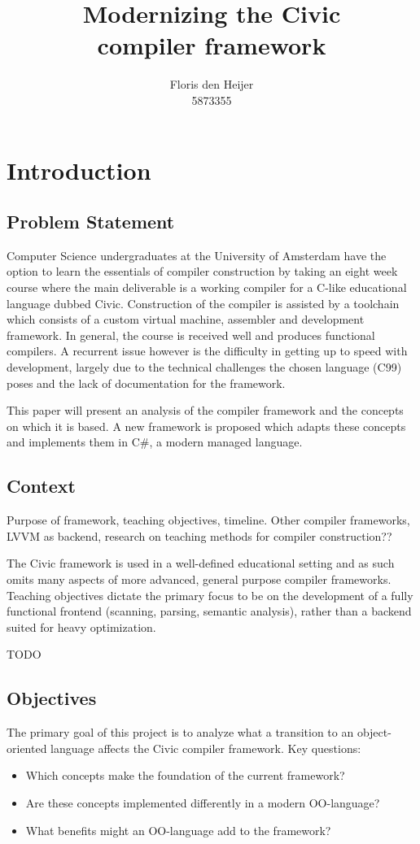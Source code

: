 \documentclass[twoside,openright]{uva-bachelor-thesis}
\title{Modernizing the Civic \\compiler framework}
\author{Floris den Heijer\\5873355}
\begin{document}
\maketitle
\begin{abstract}
	\lipsum
\end{abstract}

\tableofcontents


\chapter{Introduction}
	\section{Problem Statement}
		Computer Science undergraduates at the University of Amsterdam have the option to learn the essentials of compiler construction by taking an eight week course where the main deliverable is a working compiler for a C-like educational language dubbed Civic. Construction of the compiler is assisted by a toolchain which consists of a custom virtual machine, assembler and development framework. In general, the course is received well and produces functional compilers. A recurrent issue however is the difficulty in getting up to speed with development, largely due to the technical challenges the chosen language (C99) poses and the lack of documentation for the framework.
		
		This paper will present an analysis of the compiler framework and the concepts on which it is based. A new framework is proposed which adapts these concepts and implements them in C\#, a modern managed language.
			
	\section{Context}
		Purpose of framework, teaching objectives, timeline.
		Other compiler frameworks, LVVM as backend, research on teaching methods for compiler construction??
		
		The Civic framework is used in a well-defined educational setting and as such omits many aspects of more advanced, general purpose compiler frameworks. Teaching objectives dictate the primary focus to be on the development of a fully functional frontend (scanning, parsing, semantic analysis), rather than a backend suited for heavy optimization.
		
		TODO
	
	\section{Objectives}
		The primary goal of this project is to analyze what a transition to an object-oriented language affects the Civic compiler framework. Key questions:
		\begin{itemize}
			\item Which concepts make the foundation of the current framework?
			\item Are these concepts implemented differently in a modern OO-language?
			\item What benefits might an OO-language add to the framework?
		\end{itemize}
		
\end{document}
